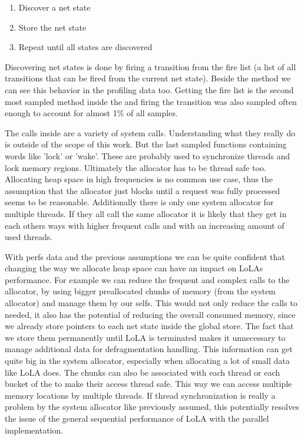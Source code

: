 \begin{enumerate}
    \item Discover a net state
    \item Store the net state
    \item Repeat until all states are discovered
\end{enumerate}
Discovering net states is done by firing a transition from the fire list (a list of all transitions that can be fired from the current net state). Beside the  method we can see this behavior in the profiling data too. Getting the fire list is the second most sampled method inside the  and firing the transition was also sampled often enough to account for almost 1\% of all samples.

The calls inside  are a variety of system calls. Understanding what they really do is outside of the scope of this work. But the last sampled functions containing words like 'lock' or 'wake'. These are probably used to synchronize threads and lock memory regions. Ultimately the allocator has to be thread safe too. Allocating heap space in high frequencies is no common use case, thus the assumption that the allocator just blocks until a request was fully processed seems to be reasonable. Additionally there is only one system allocator for multiple threads. If they all call the same allocator it is likely that they get in each others ways with higher frequent calls and with an increasing amount of used threads.

With perfs data and the previous assumptions we can be quite confident that changing the way we allocate heap space can have an impact on LoLAs performance. For example we can reduce the frequent and complex calls to the allocator, by using bigger preallocated chunks of memory (from the system allocator) and manage them by our selfs. This would not only reduce the calls to  needed, it also has the potential of reducing the overall consumed memory, since we already store pointers to each net state inside the global store. The fact that we store them permanently until LoLA is terminated makes it unnecessary to manage additional data for defragmentation handling. This information can get quite big in the system allocator, especially when allocating a lot of small data like LoLA does. The chunks can also be associated with each thread or each bucket of the  to make their access thread safe. This way we can access multiple memory locations by multiple threads. If thread synchronization is really a problem by the system allocator like previously assumed, this potentially resolves the issue of the general sequential performance of LoLA with the parallel implementation.

